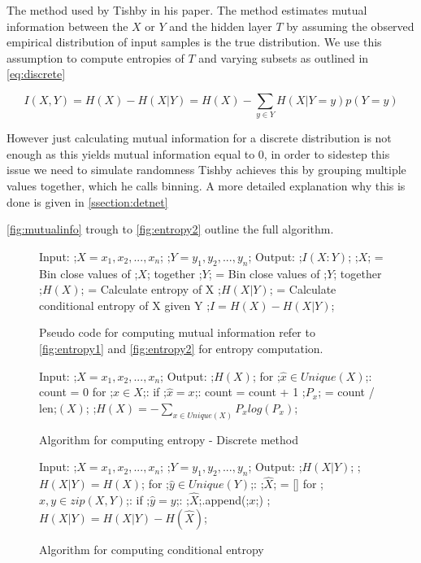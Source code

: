   The method used by Tishby in his paper. The method estimates mutual
  information between the $X$ or $Y$ and the hidden layer $T$ by assuming the
  observed empirical distribution of input samples is the true distribution. We
  use this assumption to compute entropies of $T$ and varying subsets as
  outlined in \autoref{eq:discrete}

\begin{equation}
  I(X, Y) = H(X) - H(X|Y) = H(X) - \sum _{y\in Y} H(X|Y = y)p(Y = y)
\end{equation} \label{eq:discrete}


  However just calculating mutual information for a discrete distribution is not
  enough as this yields mutual information equal to 0, in order to sidestep this
  issue we need to simulate randomness Tishby achieves this by grouping multiple
  values together, which he calls binning. A more detailed explanation why this
  is done is given in \autoref{ssection:detnet}

   \autoref{fig:mutualinfo} trough to \autoref{fig:entropy2} outline the full
   algorithm.
\begin{figure}[H]
    \begin{pythonfigure}
      Input: 
      ;$X = x_1, x_2,...,x_n$;
      ;$Y = y_1, y_2,...,y_n$;
      Output: ;$I(X:Y)$;
      ;$X$; = Bin close values of ;$X$; together
      ;$Y$; = Bin close values of ;$Y$; together
      ;$H(X)$; = Calculate entropy of X
      ;$H(X|Y)$; = Calculate conditional entropy of X given Y
      ;$I = H(X) - H(X|Y)$;
    \end{pythonfigure}
    \caption{Pseudo code for computing mutual information refer to
    \autoref{fig:entropy1} and \autoref{fig:entropy2} for entropy computation.}
    \label{fig:mutualinfo}
\end{figure}

\begin{figure}[H]
    \begin{pythonfigure}
      Input: ;$X = x_1, x_2,...,x_n$;
      Output: ;$H(X)$;
      for ;$ \hat{x}\in Unique(X)$;:
        count = 0       
        for ;$x \in X$;:
          if ;$\hat{x} = x$;:
            count = count + 1
        ;$P_x$; = count / len;$(X)$;
      ;$H(X) = - \sum _{x\in Unique(X)} P_x log(P_x)$; 
    \end{pythonfigure}
    \caption{Algorithm for computing entropy - Discrete method}
    \label{fig:entropy1}
\end{figure} 

\begin{figure}[H]
    \begin{pythonfigure}
      Input: 
      ;$X = x_1, x_2,...,x_n$;
      ;$Y = y_1, y_2,...,y_n$;
      Output: ;$H(X|Y)$;
      ;$H(X|Y) = H(X)$;
      for ;$ \hat{y}\in Unique(Y)$;:
        ;$\hat{X}$; = []
        for ;$x, y \in zip(X, Y)$;:
          if ;$\hat{y} = y$;:
            ;$\hat{X}$;.append(;$x$;)
          ;$H(X|Y) = H(X|Y) - H(\hat{X})$;
    \end{pythonfigure}
    \caption{Algorithm for computing conditional entropy}
    \label{fig:entropy2}
\end{figure}

